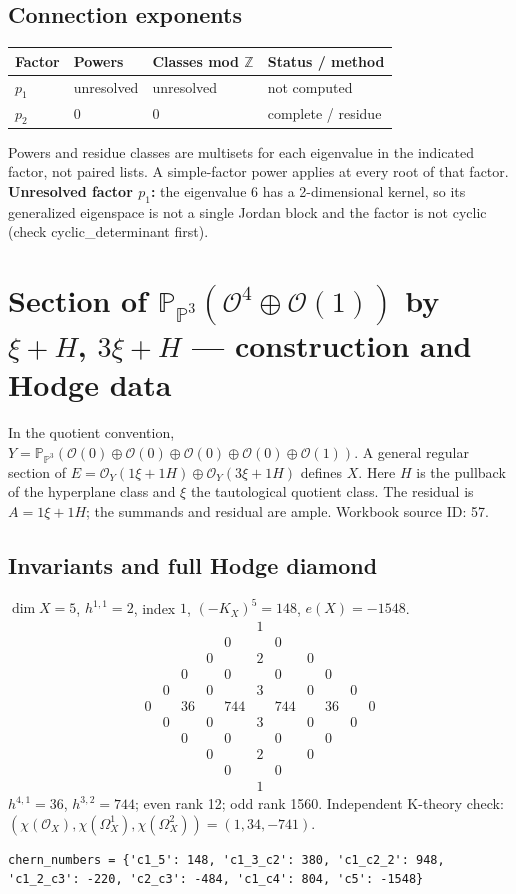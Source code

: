 \documentclass[10pt,a4paper]{article}
\begin{document}
\subsection*{Connection exponents}
\begin{center}\begin{tabular}{llll}\toprule Factor & Powers & Classes mod $\mathbb Z$ & Status / method\\\midrule
$p_{1}$ & unresolved & unresolved & not computed\\
$p_{2}$ & $0$ & $0$ & complete / residue\\
\bottomrule\end{tabular}\end{center}
Powers and residue classes are multisets for each eigenvalue in the indicated factor, not paired lists. A simple-factor power applies at every root of that factor.
\textbf{Unresolved factor $p_{1}$:} the eigenvalue 6 has a 2-dimensional kernel, so its generalized eigenspace is not a single Jordan block and the factor is not cyclic (check cyclic\_determinant first).
\clearpage\section*{Section of $\mathbb P_{\mathbb P^{3}}(\mathcal O^{4}\oplus \mathcal O(1))$ by $\xi +H$, $3\xi +H$ --- construction and Hodge data}\label{entry:PB5-057}
In the quotient convention, $Y=\mathbb P_{\mathbb P^{3}}(\mathcal O(0)\oplus\mathcal O(0)\oplus\mathcal O(0)\oplus\mathcal O(0)\oplus\mathcal O(1))$.
A general regular section of $E=\mathcal O_Y(1\xi+1H)\oplus\mathcal O_Y(3\xi+1H)$ defines $X$.
Here $H$ is the pullback of the hyperplane class and $\xi$ the tautological quotient class. The residual is $A=1\xi+1H$; the summands and residual are ample.
Workbook source ID: 57.
\subsection*{Invariants and full Hodge diamond}
$\dim X=5$, $h^{1,1}=2$, index $1$, $(-K_X)^5=148$, $e(X)=-1548$.
\[\begin{array}{ccccccccccc}&&&&&1&&&&&\\&&&&0&&0&&&&\\&&&0&&2&&0&&&\\&&0&&0&&0&&0&&\\&0&&0&&3&&0&&0&\\0&&36&&744&&744&&36&&0\\&0&&0&&3&&0&&0&\\&&0&&0&&0&&0&&\\&&&0&&2&&0&&&\\&&&&0&&0&&&&\\&&&&&1&&&&&\end{array}\]
$h^{4,1}=36$, $h^{3,2}=744$; even rank 12; odd rank 1560.
Independent K-theory check: $(\chi(\mathcal O_X),\chi(\Omega_X^1),\chi(\Omega_X^2))=(1, 34, -741)$.
\begin{lstlisting}
chern_numbers = {'c1_5': 148, 'c1_3_c2': 380, 'c1_c2_2': 948, 'c1_2_c3': -220, 'c2_c3': -484, 'c1_c4': 804, 'c5': -1548}
\end{lstlisting}
\end{document}
